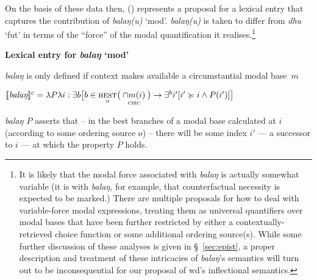 On the basis of these data then, () represents a proposal for a lexical entry that captures the contribution of \textit{balaŋ(u)} `\gls{mod}'. \textit{balaŋ(u)} is taken to differ from \textit{dhu} `\gls{fut}' in terms of the ``force'' of the modal quantification it realises.\footnote{It is likely that the modal force associated with \textit{balaŋ} is actually somewhat variable (it is with \textit{balaŋ}, for example, that counterfactual necessity is expected to be marked.) There are multiple proposals for how to deal with variable-force modal expressions, treating them as universal quantifiers over modal bases that have been further restricted by either a contextually-retrieved choice function or some additional ordering source(s). While some further discussion of these analyses is given in \S~\ref{sec:epist}, a proper description and treatment of these intricacies of \textit{balaŋ}'s semantics will turn out to be inconsequential for our proposal of \gls{wd}'s inflectional semantics.} 



\pex \textbf{Lexical entry for \textit{balaŋ} `\gls{mod}'}

\textit{balaŋ} is only defined if context makes available a circumstantial modal base~$ m $

$ \denote[c]{\textit{balaŋ}}=\lambda P\lambda i:\exists b\big[b\in\underset{o}{\textsc{best}}\big(\underset{\textsc{circ}}{\cap m(i)}\big)\to\exists^b i'[i'\succcurlyeq i\wedge P(i')]\big] $

\textit{balaŋ $ P $} %
asserts that -- in the best branches of a modal base calculated at $ i $ (according to some ordering source $ o $) -- there will be some  index $ i' $ --- a successor to $ i $ --- at which the property $ P $ holds.

\xe

